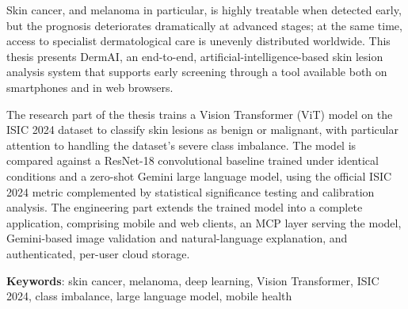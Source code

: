 Skin cancer, and melanoma in particular, is highly treatable when detected early,
but the prognosis deteriorates dramatically at advanced stages; at the same time,
access to specialist dermatological care is unevenly distributed worldwide. This
thesis presents DermAI, an end-to-end, artificial-intelligence-based skin lesion
analysis system that supports early screening through a tool available both on
smartphones and in web browsers.

The research part of the thesis trains a Vision Transformer (ViT) model on the
ISIC 2024 dataset to classify skin lesions as benign or malignant, with particular
attention to handling the dataset's severe class imbalance. The model is compared
against a ResNet-18 convolutional baseline trained under identical conditions and
a zero-shot Gemini large language model, using the official ISIC 2024 metric
complemented by statistical significance testing and calibration analysis. The
engineering part extends the trained model into a complete application, comprising
mobile and web clients, an MCP layer serving the model, Gemini-based image
validation and natural-language explanation, and authenticated, per-user cloud
storage.

\textbf{Keywords}: skin cancer, melanoma, deep learning, Vision Transformer, ISIC
2024, class imbalance, large language model, mobile health
